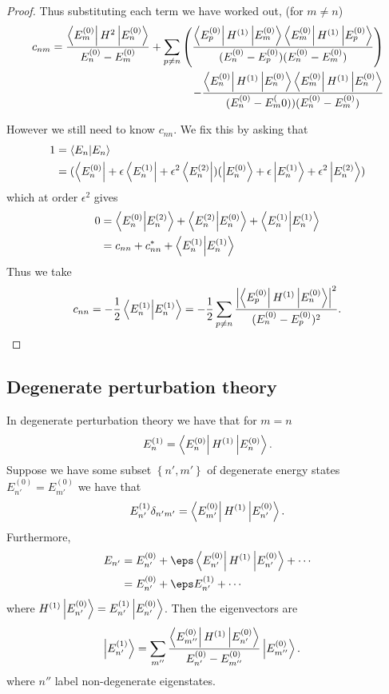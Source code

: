 \documentclass[12pt, a4paper]{article}
\begin{document}
\begin{proof}
Thus substituting each term we have worked out, (for \(m \neq n\))
\[\begin{split}
    c_{nm} = \frac{\bra{E_{m}^{(0)}} H^{2} \ket{E_{n}^{(0)}}}{E_{n}^{(0)} - E_{m}^{(0)}} + \sum_{p \neq n} \left( \frac{\bra{E_p^{(0)}} H^{(1)} \ket{E_m^{(0)}} \bra{E_m^{(0)}} H^{(1)} \ket{E_p^{(0)}} }{(E_n^{(0)}-E_p^{(0)})(E_n^{(0)}-E_m^{(0)})} \right) \\ -\frac{\bra{E_n^{(0)}} H^{(1)} \ket{E_n^{(0)}} \bra{E_m^{(0)}} H^{(1)} \ket{E_n^{(0)}}}{(E_n^{(0)}-E_m^(0))(E_n^{(0)}-E_m^{(0)})}
\end{split}\]

However we still need to know \(c_{nn}\). We fix this by asking that
\[\begin{aligned}
    1 &= \braket{E_{n}} \\
    &= (\bra{E_{n}^{(0)}} + \epsilon\bra{E_{n}^{(1)}} + \epsilon^{2}\bra{E_{n}^{(2)}})(\ket{E_{n}^{(0)}} + \epsilon\ket{E_{n}^{(1)}} + \epsilon^{2}\ket{E_{n}^{(2)}})
\end{aligned}\]
which at order \(\epsilon^{2}\) gives
\[\begin{aligned}
    0 &= \bra{E_{n}^{(0)}}\ket{E_{n}^{(2)}} + \bra{E_{n}^{(2)}}\ket{E_{n}^{(0)}} + \bra{E_{n}^{(1)}}\ket{E_{n}^{(1)}} \\
    &= c_{nn} + c_{nn}^{*} + \braket{E_{n}^{(1)}}
\end{aligned}\]
Thus we take
\[
c_{nn} = -\frac{1}{2}\braket{E_{n}^{(1)}} = -\frac{1}{2} \sum_{p \neq n} \frac{\abs{\bra{E_{p}^{(0)}} H^{(1)} \ket{E_{n}^{(0)}}}^{2}}{(E_{n}^{(0)} - E_{p}^{(0)})^{2}}.
\]
\end{proof}

\subsection{Degenerate perturbation theory}

\begin{mdprop}
    In degenerate perturbation theory we have that for \(m=n\)
    \[E_n^{(1)} = \bra{E_n^{(0)}} H^{(1)} \ket{E_n^{(0)}}.\]
    Suppose we have some subset \(\left\{ n',m' \right\}\) of degenerate energy states \(E_{n'}^{(0)}=E_{m'}^{(0)}\) we have that 
    \[E_{n'}^{(1)} \delta_{n'm'} =\bra{E_{m'}^{(0)}} H^{(1)} \ket{E_{n'}^{(0)}}.\]
    Furthermore, 
    \[\begin{aligned}
        E_{n'} &= E_{n'}^{(0)} + \eps \bra{E_{n'}^{(0)}} H^{(1)} \ket{E_{n'}^{(0)}} +\cdots \\
        &= E_{n'}^{(0)} +\eps E_{n'}^{(1)} +\cdots 
    \end{aligned}\]
    where \(H^{(1)}\ket{E_{n'}^{(0)}} = E_{n'}^{(1)} \ket{E_{n'}^{(0)}}\). Then the eigenvectors are 
    \[\begin{aligned}
        \ket{E_{n'}^{(1)}} &= \sum_{m''} \frac{\bra{E_{m''}^{(0)}} H^{(1)} \ket{E_{n'}^{(0)}}}{E_{n'}^{(0)}-E_{m''}^{(0)}} \ket{E_{m''}^{(0)}}.
    \end{aligned}\]
    where \(n''\) label non-degenerate eigenstates.
\end{mdprop}
\end{document}
